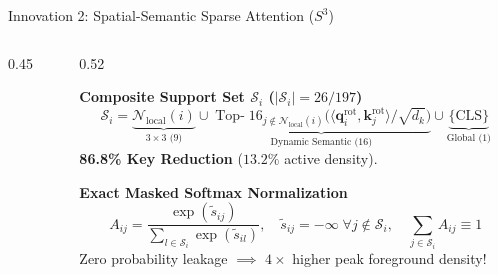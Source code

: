\documentclass[aspectratio=169,10pt]{beamer}
\begin{document}
\begin{frame}{Innovation 2: Spatial-Semantic Sparse Attention ($S^3$)}
\begin{columns}[c]
\begin{column}{0.45\textwidth}
{%
        }
    \end{column}

    \begin{column}{0.52\textwidth}
        \begin{block}{\textbf{Composite Support Set $\mathcal{S}_i$ ($|\mathcal{S}_i| = 26 / 197$)}}
            \scriptsize
            \vspace{-0.4em}
            \[
                \mathcal{S}_i = \underbrace{\mathcal{N}_{\text{local}}(i)}_{3\times 3\text{ (9)}} \cup \underbrace{\operatorname{Top-}16_{j \notin \mathcal{N}_{\text{local}}(i)}\!\big(\langle \mathbf{q}_i^{\text{rot}}, \mathbf{k}_j^{\text{rot}}\rangle / \sqrt{d_k}\big)}_{\text{Dynamic Semantic (16)}} \cup \underbrace{\{\text{CLS}\}}_{\text{Global (1)}}
            \]
            \vspace{-0.4em}
            \centering \textbf{86.8\% Key Reduction} ($13.2\%$ active density).
        \end{block}
        
        \vspace{-0.2em}
        \begin{exampleblock}{\textbf{Exact Masked Softmax Normalization}}
            \scriptsize
            \vspace{-0.3em}
            \[
                A_{ij} = \frac{\exp(\tilde{s}_{ij})}{\sum_{l \in \mathcal{S}_i} \exp(\tilde{s}_{il})}, \quad \tilde{s}_{ij} = -\infty \;\forall j \notin \mathcal{S}_i, \quad \sum_{j \in \mathcal{S}_i} A_{ij} \equiv 1
            \]
            \vspace{-0.4em}
            Zero probability leakage $\implies$ $4\times$ higher peak foreground density!
        \end{exampleblock}
    \end{column}
\end{columns}
\end{frame}
\end{document}
